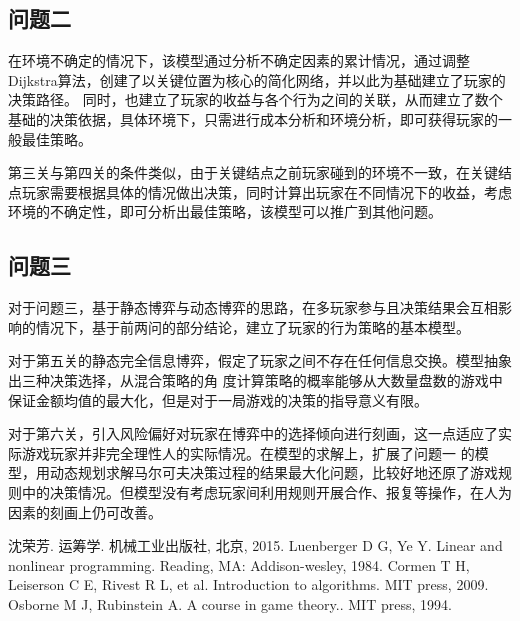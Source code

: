 \documentclass[bwprint]{cumcmthesis} %
\begin{document}
\subsection{问题二}

在环境不确定的情况下，该模型通过分析不确定因素的累计情况，通过调整Dijkstra算法，创建了以关键位置为核心的简化网络，并以此为基础建立了玩家的决策路径。
同时，也建立了玩家的收益与各个行为之间的关联，从而建立了数个基础的决策依据，具体环境下，只需进行成本分析和环境分析，即可获得玩家的一般最佳策略。

第三关与第四关的条件类似，由于关键结点之前玩家碰到的环境不一致，在关键结点玩家需要根据具体的情况做出决策，同时计算出玩家在不同情况下的收益，考虑
环境的不确定性，即可分析出最佳策略，该模型可以推广到其他问题。


\subsection{问题三}

对于问题三，基于静态博弈与动态博弈的思路，在多玩家参与且决策结果会互相影响的情况下，基于前两问的部分结论，建立了玩家的行为策略的基本模型。

对于第五关的静态完全信息博弈，假定了玩家之间不存在任何信息交换。模型抽象出三种决策选择，从混合策略的角
度计算策略的概率能够从大数量盘数的游戏中保证金额均值的最大化，但是对于一局游戏的决策的指导意义有限。

对于第六关，引入风险偏好对玩家在博弈中的选择倾向进行刻画，这一点适应了实际游戏玩家并非完全理性人的实际情况。在模型的求解上，扩展了问题一
的模型，用动态规划求解马尔可夫决策过程的结果最大化问题，比较好地还原了游戏规则中的决策情况。但模型没有考虑玩家间利用规则开展合作、报复等操作，在人为因素的刻画上仍可改善。



\begin{thebibliography}{9}%
    沈荣芳.
    \newblock 运筹学\allowbreak[M].
    \newblock 机械工业出版社, 北京, 2015.
    Luenberger D G, Ye Y.
    \newblock Linear and nonlinear programming\allowbreak[M].
    \newblock Reading, MA: Addison-wesley, 1984.
    Cormen T H, Leiserson C E, Rivest R L, et al.
    \newblock Introduction to algorithms\allowbreak[M].
    \newblock MIT press, 2009.
    Osborne M J, Rubinstein A.  
    \newblock A course in game theory.\allowbreak[M].
    \newblock MIT press, 1994.
\end{thebibliography}
\end{document}
